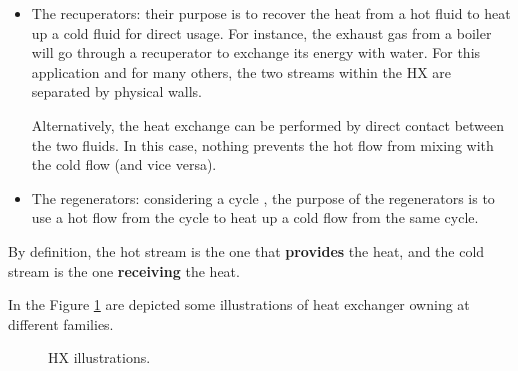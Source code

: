 \begin{itemize}
    \item The recuperators: their purpose is to recover the heat from a hot fluid to heat up a cold fluid for direct usage. For instance, the exhaust gas from a boiler will go through a recuperator to exchange its energy with water. For this application and for many others, the two streams within the HX are separated by physical walls.

    Alternatively, the heat exchange can be performed by direct contact between the two fluids. In this case, nothing prevents the hot flow from mixing with the cold flow (and vice versa).
    \item The regenerators: considering a cycle , the purpose of the regenerators is to use a hot flow from the cycle to heat up a cold flow from the same cycle.
\end{itemize}

By definition, the hot stream is the one that \textbf{provides} the heat, and the cold stream is the one \textbf{receiving} the heat.

In the Figure \ref{fig:C4_HX} are depicted some illustrations of heat exchanger owning at different families.
\begin{figure}[h]
    \centering
    \hfill
    \hfill
    \caption{HX illustrations.} \label{fig:C4_HX}
\end{figure}

